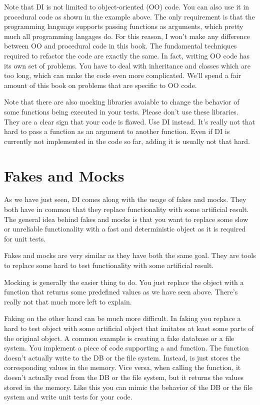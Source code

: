 Note that DI is not limited to object-oriented (OO) code. You can also use it in procedural code as shown in the example above. The only requirement is that the programming language supports passing functions as arguments, which pretty much all programming langages do. For this reason, I won't make any difference between OO and procedural code in this book. The fundamental techniques required to refactor the code are exactly the same. In fact, writing OO code has its own set of problems. You have to deal with inheritance and classes which are too long, which can make the code even more complicated. We'll spend a fair amount of this book on problems that are specific to OO code.

Note that there are also mocking libraries avaiable to change the behavior of some functions being executed in your tests. Please don't use these libraries. They are a clear sign that your code is flawed. Use DI instead. It's really not that hard to pass a function as an argument to another function. Even if DI is currently not implemented in the code so far, adding it is usually not that hard.

\section{Fakes and Mocks}

As we have just seen, DI comes along with the usage of fakes and mocks. They both have in common that they replace functionality with some artificial result. The general idea behind fakes and mocks is that you want to replace some slow or unreliable functionality with a fast and deterministic object as it is required for unit tests.

Fakes and mocks are very similar as they have both the same goal. They are tools to replace some hard to test functionality with some artificial result.

Mocking is generally the easier thing to do. You just replace the object with a function that returns some predefined values as we have seen above. There's really not that much more left to explain.

Faking on the other hand can be much more difficult. In faking you replace a hard to test object with some artificial object that imitates at least some parts of the original object. A common example is creating a fake database or a file system. You implement a piece of code supporting a  and  function. The  function doesn't actually write to the DB or the file system. Instead, is just stores the corresponding values in the memory. Vice versa, when calling the  function, it doesn't actually read from the DB or the file system, but it returns the values stored in the memory. Like this you can mimic the behavior of the DB or the file system and write unit tests for your code.

